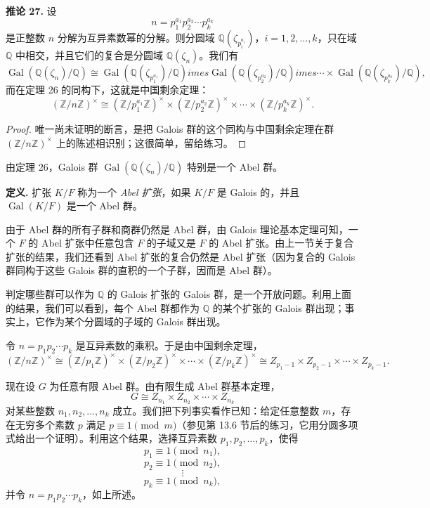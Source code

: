 \noindent\textbf{推论 27.} 设
\[
n=p_1^{a_1}p_2^{a_2}\cdots p_k^{a_k}
\]
是正整数 $n$ 分解为互异素数幂的分解。则分圆域 $\mathbb Q(\zeta_{p_i^{a_i}})$，$i=1,2,\ldots,k$，只在域 $\mathbb Q$ 中相交，并且它们的复合是分圆域 $\mathbb Q(\zeta_n)$。我们有
\[
\operatorname{Gal}(\mathbb Q(\zeta_n)/\mathbb Q)
\cong
\operatorname{Gal}(\mathbb Q(\zeta_{p_1^{a_1}})/\mathbb Q)	imes
\operatorname{Gal}(\mathbb Q(\zeta_{p_2^{a_2}})/\mathbb Q)	imes\cdots\times
\operatorname{Gal}(\mathbb Q(\zeta_{p_k^{a_k}})/\mathbb Q),
\]
而在定理 26 的同构下，这就是中国剩余定理：
\[
(\mathbb Z/n\mathbb Z)^\times
\cong
(\mathbb Z/p_1^{a_1}\mathbb Z)^\times\times
(\mathbb Z/p_2^{a_2}\mathbb Z)^\times\times\cdots\times
(\mathbb Z/p_k^{a_k}\mathbb Z)^\times.
\]

\begin{proof}
唯一尚未证明的断言，是把 Galois 群的这个同构与中国剩余定理在群 $(\mathbb Z/n\mathbb Z)^\times$ 上的陈述相识别；这很简单，留给练习。
\end{proof}

由定理 26，Galois 群 $\operatorname{Gal}(\mathbb Q(\zeta_n)/\mathbb Q)$ 特别是一个 Abel 群。

\noindent\textbf{定义.} 扩张 $K/F$ 称为一个 \emph{Abel 扩张}，如果 $K/F$ 是 Galois 的，并且 $\operatorname{Gal}(K/F)$ 是一个 Abel 群。

由于 Abel 群的所有子群和商群仍然是 Abel 群，由 Galois 理论基本定理可知，一个 $F$ 的 Abel 扩张中任意包含 $F$ 的子域又是 $F$ 的 Abel 扩张。由上一节关于复合扩张的结果，我们还看到 Abel 扩张的复合仍然是 Abel 扩张（因为复合的 Galois 群同构于这些 Galois 群的直积的一个子群，因而是 Abel 群）。

判定哪些群可以作为 $\mathbb Q$ 的 Galois 扩张的 Galois 群，是一个开放问题。利用上面的结果，我们可以看到，每个 Abel 群都作为 $\mathbb Q$ 的某个扩张的 Galois 群出现；事实上，它作为某个分圆域的子域的 Galois 群出现。

令 $n=p_1p_2\cdots p_k$ 是互异素数的乘积。于是由中国剩余定理，
\[
(\mathbb Z/n\mathbb Z)^\times
\cong
(\mathbb Z/p_1\mathbb Z)^\times\times(\mathbb Z/p_2\mathbb Z)^\times\times\cdots\times(\mathbb Z/p_k\mathbb Z)^\times
\cong Z_{p_1-1}\times Z_{p_2-1}\times\cdots\times Z_{p_k-1}. \tag{14.11}
\]

现在设 $G$ 为任意有限 Abel 群。由有限生成 Abel 群基本定理，
\[
G\cong Z_{n_1}\times Z_{n_2}\times\cdots\times Z_{n_k}
\]
对某些整数 $n_1,n_2,\ldots,n_k$ 成立。我们把下列事实看作已知：给定任意整数 $m$，存在无穷多个素数 $p$ 满足 $p\equiv 1\pmod m$（参见第 13.6 节后的练习，它用分圆多项式给出一个证明）。利用这个结果，选择互异素数 $p_1,p_2,\ldots,p_k$，使得
\[
p_1\equiv 1\pmod {n_1},
\]
\[
p_2\equiv 1\pmod {n_2},
\]
\[
\vdots
\]
\[
p_k\equiv 1\pmod {n_k},
\]
并令 $n=p_1p_2\cdots p_k$，如上所述。

